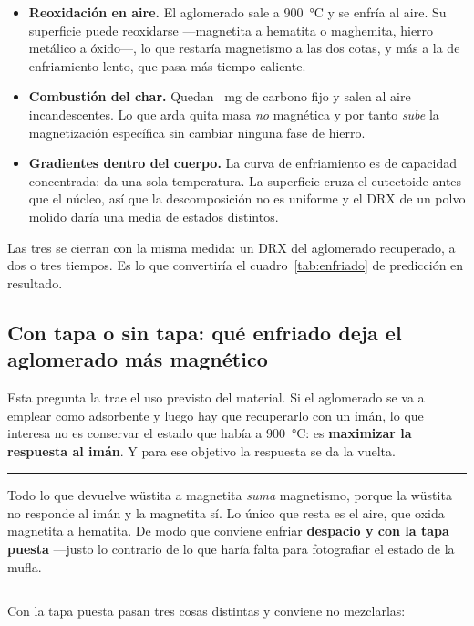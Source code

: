 \documentclass[11pt,a4paper]{article}
\newenvironment{clave}
  {\par\medskip\noindent\rule{\linewidth}{0.9pt}\par\nobreak\smallskip
   \noindent\ignorespaces}
  {\par\smallskip\noindent\rule{\linewidth}{0.9pt}\par\medskip}
\begin{document}
\begin{itemize}[leftmargin=*,itemsep=2pt]
\item \textbf{Reoxidación en aire.} El aglomerado sale a \SI{900}{\celsius} y se
enfría al aire. Su superficie puede reoxidarse ---magnetita a hematita o
maghemita, hierro metálico a óxido---, lo que restaría magnetismo a las dos
cotas, y más a la de enfriamiento lento, que pasa más tiempo caliente.
\item \textbf{Combustión del char.} Quedan \datCarbono\ \si{\milli\gram} de
carbono fijo y salen al aire incandescentes. Lo que arda quita masa \emph{no}
magnética y por tanto \emph{sube} la magnetización específica sin cambiar
ninguna fase de hierro.
\item \textbf{Gradientes dentro del cuerpo.} La curva de enfriamiento es de
capacidad concentrada: da una sola temperatura. La superficie cruza el
eutectoide antes que el núcleo, así que la descomposición no es uniforme y el
DRX de un polvo molido daría una media de estados distintos.
\end{itemize}

\noindent
Las tres se cierran con la misma medida: un DRX del aglomerado recuperado, a dos
o tres tiempos. Es lo que convertiría el cuadro~\ref{tab:enfriado} de predicción
en resultado.

\subsection{Con tapa o sin tapa: qué enfriado deja el aglomerado más magnético}
\label{sec:rutas}

Esta pregunta la trae el uso previsto del material. Si el aglomerado se va a
emplear como adsorbente y luego hay que recuperarlo con un imán, lo que interesa
no es conservar el estado que había a \SI{900}{\celsius}: es \textbf{maximizar la
respuesta al imán}. Y para ese objetivo la respuesta se da la vuelta.

\begin{clave}
Todo lo que devuelve wüstita a magnetita \emph{suma} magnetismo, porque la
wüstita no responde al imán y la magnetita sí. Lo único que resta es el aire,
que oxida magnetita a hematita. De modo que conviene enfriar \textbf{despacio y
con la tapa puesta} ---justo lo contrario de lo que haría falta para fotografiar
el estado de la mufla.
\end{clave}

\noindent
Con la tapa puesta pasan tres cosas distintas y conviene no mezclarlas:
\end{document}
